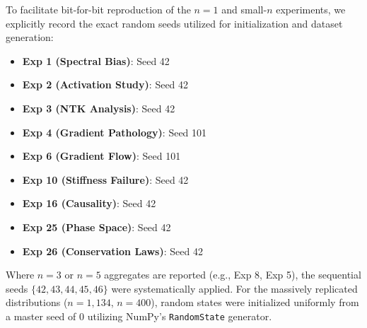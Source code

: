 To facilitate bit-for-bit reproduction of the $n=1$ and small-$n$ experiments, we explicitly record the exact random seeds utilized for initialization and dataset generation:

\begin{itemize}
    \item \textbf{Exp 1 (Spectral Bias)}: Seed 42
    \item \textbf{Exp 2 (Activation Study)}: Seed 42
    \item \textbf{Exp 3 (NTK Analysis)}: Seed 42
    \item \textbf{Exp 4 (Gradient Pathology)}: Seed 101
    \item \textbf{Exp 6 (Gradient Flow)}: Seed 101
    \item \textbf{Exp 10 (Stiffness Failure)}: Seed 42
    \item \textbf{Exp 16 (Causality)}: Seed 42
    \item \textbf{Exp 25 (Phase Space)}: Seed 42
    \item \textbf{Exp 26 (Conservation Laws)}: Seed 42
\end{itemize}

Where $n=3$ or $n=5$ aggregates are reported (e.g., Exp 8, Exp 5), the sequential seeds $\{42, 43, 44, 45, 46\}$ were systematically applied. For the massively replicated distributions ($n=1{,}134$, $n=400$), random states were initialized uniformly from a master seed of $0$ utilizing NumPy's \texttt{RandomState} generator.
